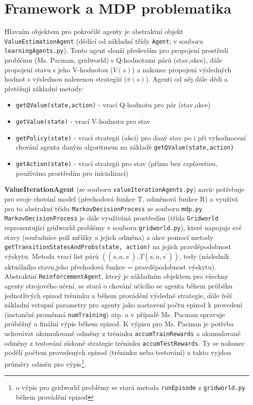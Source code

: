 \section{Framework a MDP problematika}
Hlavním objektem pro pokročilé agenty je abstraktní objekt \texttt{ValueEstimationAgent} (dědící od základní třídy \texttt{Agent}; v souboru \texttt{learningAgents.py}). Tento agent slouží především pro propojení prostředí problému (Ms. Pacman, gridworld) s Q-hodnotami párů (stav,akce), dále propojení stavu s jeho V-hodnotou ($V(s)$) a nakonec propojení výsledných hodnot s výslednou nalezenou strategiií ($\pi(s)$).
Agenti od něj dále dědí a přetěžují základní metody:
\begin{itemize}
\item \texttt{getQValue(state,action)} - vrací Q-hodnotu pro pár (stav,akce)
\item \texttt{getValue(state)} - vrací V-hodnotu pro stav
\item \texttt{getPolicy(state)} - vrací strategii (akci) pro daný stav po i při vyhodnocení chování agenta daným algoritmem na základě \texttt{getQValue(state,action)}
\item \texttt{getAction(state)} - vrací strategii pro stav (přímo bez \textit{exploration}, používáno prostředím pro inicializaci)
\end{itemize}
\textbf{ValueIterationAgent} (ze souboru \texttt{valueIterationAgents.py}) navíc potřebuje pro svoje chování model (přechodová funkce T, odměnová funkce R) a využívá pro to abstrakní třídu \texttt{MarkovDecisionProcess} ze souboru \texttt{mdp.py}. \texttt{MarkovDecisionProcess} je dále využíváná prostředím (třída \texttt{Gridworld} reprezentující gridworld problémy v souboru \texttt{gridworld.py}), které napojuje své stavy (souřadnice polí mřížky a jejich odměna) a akce pomocí metody \texttt{getTransitionStatesAndProbs(state, action)} na jejich pravděpodobnost výskytu. Metoda vrací list párů $((s,a,s^\prime),T(s,a,s^\prime))$, tedy (následník aktuálního stavu,jeho přechodová funkce = pravděpodobnost výskytu).
\newline
Abstraktní \texttt{ReinforcementAgent}, který je základním objektem pro všechny agenty strojového učení, se stará o chování učícího se agenta během průběhu jednotlivých epizod tréninku a během provádění výsledné strategie, dále řeší základní vstupní parametry pro agenty jako nastavení počtu epizod k provedení (instanční proměnná \texttt{numTraining}) atp. a v případě Ms. Pacman spravuje průběžný a finální výpis během epizod. K výpisu pro Ms. Pacman je potřeba uchovávat akumulované odměny z tréninku \texttt{accumTrainRewards} a akumulované odměny z testování získané strategie tréninku \texttt{accumTestRewards}. Ty se nakonec podělí počtem provedených epizod (tréninku nebo testování) a takto vyjdou průměry odměn pro výpis\footnote{o výpis pro gridworld problémy se stará metoda \texttt{runEpisode} z \texttt{gridworld.py} během provádění epizod}.
